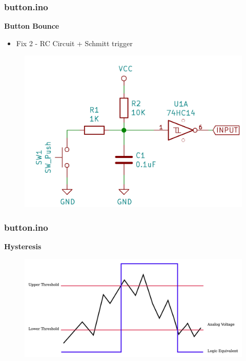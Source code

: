 \documentclass[t]{beamer}
\begin{document}

\begin{frame}[t]
\frametitle{button.ino}
\textbf{Button Bounce}
\begin{itemize}
	\item Fix 2 - RC Circuit + Schmitt trigger
\end{itemize}
\begin{figure}
	\includegraphics[scale=0.3]{schmittSwitch.PNG}
\end{figure}
\end{frame}


\begin{frame}[t]
\frametitle{button.ino}
\textbf{Hysteresis}
\begin{figure}
	\includegraphics[scale=0.43]{hysteresis1.png}
\end{figure}
\end{frame}
\end{document}
